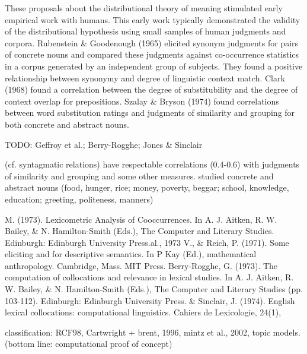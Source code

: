 \documentclass[man,floatsintext]{apa6}
\begin{document}
These proposals about the distributional theory of meaning stimulated
early empirical work with humans. This early work typically
demonstrated the validity of the distributional hypothesis using small
samples of human judgments and corpora. Rubenstein \& Goodenough
(1965) elicited synonym judgments for pairs of concrete nouns and
compared these judgments against co-occurrence statistics in a corpus
generated by an independent group of subjects. They found a positive
relationship between synonymy and degree of linguistic context
match. Clark (1968) found a correlation between the degree of
substitubility and the degree of context overlap for
prepositions. Szalay \& Bryson (1974) found correlations between word
substitution ratings and judgments of similarity and grouping for both
concrete and abstract nouns.

TODO: Geffroy et al.; Berry-Rogghe; Jones \& Sinclair

(cf. syntagmatic relations) have respectable correlations (0.4-0.6) %
with judgments of similarity and grouping and some other %
measures. studied concrete and abstract nouns (food, hunger, rice; %
money, poverty, beggar; school, knowledge, education; greeting, %
politeness, manners)


M. (1973). Lexicometric Analysis of Cooccurrences. In A. J. Aitken, %
R. W. Bailey, \& N. Hamilton-Smith (Eds.), The Computer and Literary %
Studies. Edinburgh: Edinburgh University Press.al., 1973 %
V., \& Reich, P. (1971). Some eliciting and %
for descriptive semantics. In P Kay (Ed.), %
mathematical anthropology. Cambridge, Mass. MIT Press.  %
Berry-Rogghe, G. (1973). The computation of collocations and %
relevance in lexical studies. In A. J. Aitken, R. W. Bailey, \& %
N. Hamilton-Smith (Eds.), The Computer and Literary Studies %
(pp. 103-112). Edinburgh: Edinburgh University Press.  %
\& Sinclair, J. (1974). English lexical collocations: %
computational linguistics. Cahiers de Lexicologie, 24(1), %


classification: RCF98, Cartwright + brent, 1996, mintz et al., 2002, %
topic models. (bottom line: computational proof of concept)
\end{document}
